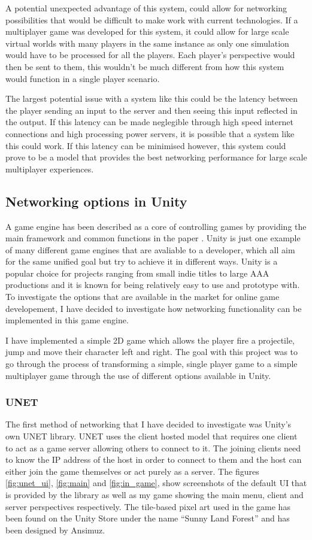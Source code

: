 A potential unexpected advantage of this system, could allow for networking possibilities that would be difficult to make work with current technologies. If a multiplayer game was developed for this system, it could allow for large scale virtual worlds with many players in the same instance as only one simulation would have to be processed for all the players. Each player's perspective would then be sent to them, this wouldn't be much different from how this system would function in a single player scenario.

The largest potential issue with a system like this could be the latency between the player sending an input to the server and then seeing this input reflected in the output. If this latency can be made neglegible through high speed internet connections and high processing power servers, it is possible that a system like this could work. If this latency can be minimised however, this system could prove to be a model that provides the best networking performance for large scale multiplayer experiences.


\newpage
\subsection{Networking options in Unity}
A game engine has been described as a core of controlling games by providing the main framework and common functions in the paper . Unity is just one example of many different game engines that are avaliable to a developer, which all aim for the same unified goal but try to achieve it in different ways. Unity is a popular choice for projects ranging from small indie titles to large AAA productions and it is known for being relatively easy to use and prototype with. To investigate the options that are available in the market for online game developement, I have decided to investigate how networking functionality can be implemented in this game engine.

I have implemented a simple 2D game which allows the player fire a projectile, jump and move their character left and right. The goal with this project was to go through the process of transforming a simple, single player game to a simple multiplayer game through the use of different options available in Unity.

\subsubsection{UNET}
The first method of networking that I have decided to investigate was Unity's own UNET library. UNET uses the client hosted model that requires one client to act as a game server allowing others to connect to it. The joining clients need to know the IP address of the host in order to connect to them and the host can either join the game themselves or act purely as a server. The figures \ref{fig:unet_ui}, \ref{fig:main} and \ref{fig:in_game}, show screenshots of the default UI that is provided by the library as well as my game showing the main menu, client and server perspectives respectively. The tile-based pixel art used in the game has been found on the Unity Store under the name ``Sunny Land Forest'' and has been designed by Ansimuz.

